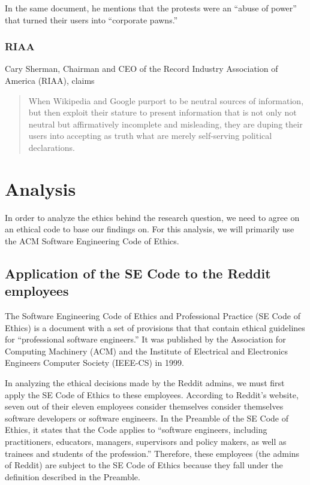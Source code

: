 \documentclass[11pt]{article}
\begin{document}
\begin{multicols}{2}
In the same document, he mentions that the protests were an ``abuse of power'' that turned their users into ``corporate pawns.''\cite{chris-dodd-response}

   \subsubsection{RIAA}

Cary Sherman, Chairman and CEO of the Record Industry Association of America (RIAA),\cite{riaa-ceo} claims

\begin{quote}When Wikipedia and Google purport to be neutral sources of information, but then exploit their stature to present information that is not only not neutral but affirmatively incomplete and misleading, they are duping their users into accepting as truth what are merely self-serving political declarations.\cite{cary-sherman-response}\end{quote}


   \section{Analysis}

In order to analyze the ethics behind the research question, we need to agree on an ethical code to base our findings on. For this analysis, we will primarily use the ACM Software Engineering Code of Ethics.

   \subsection{Application of the SE Code to the Reddit employees}

The Software Engineering Code of Ethics and Professional Practice (SE Code of Ethics) is a document with a set of provisions that that contain ethical guidelines for ``professional software engineers.'' It was published by the Association for Computing Machinery (ACM) and the Institute of Electrical and Electronics Engineers Computer Society (IEEE-CS) in 1999.\cite{se-code} 

In analyzing the ethical decisions made by the Reddit admins, we must first apply the SE Code of Ethics to these employees. According to Reddit's website, seven out of their eleven employees consider themselves consider themselves software developers or software engineers.\cite{reddit-faqs-jobs} In the Preamble of the SE Code of Ethics, it states that the Code applies to ``software engineers, including practitioners, educators, managers, supervisors and policy makers, as well as trainees and students of the profession.''\cite{se-code} Therefore, these employees (the admins of Reddit) are subject to the SE Code of Ethics because they fall under the definition described in the Preamble.



\end{multicols}
\end{document}
